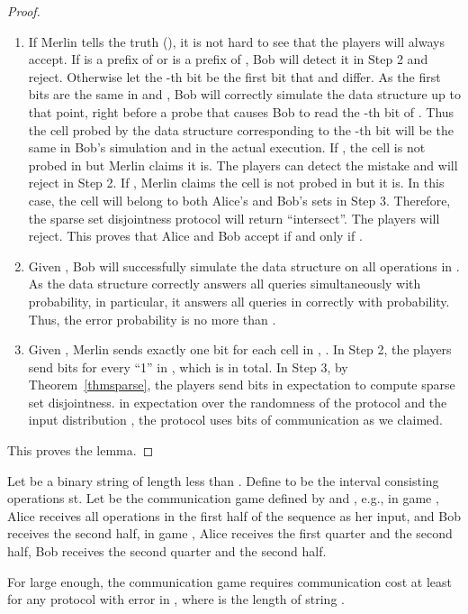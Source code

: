 \documentclass[11pt]{article}
\begin{document}
\begin{proof}
{\begin{enumerate}
\item
	If Merlin tells the truth (), it is not hard to see that the players will always accept. If  is a prefix of  or  is a prefix of , Bob will detect it in Step 2 and reject. Otherwise let the -th bit be the first bit that  and  differ. As the first  bits are the same in  and , Bob will correctly simulate the data structure up to that point, right before a probe that causes Bob to read the -th bit of . Thus the cell probed by the data structure corresponding to the -th bit will be the same in Bob's simulation and in the actual execution.  If , the cell is not probed in  but Merlin claims it is. The players can detect the mistake and will reject in Step 2. If , Merlin claims the cell is not probed in  but it is. In this case, the cell will belong to both Alice's and Bob's sets in Step 3. Therefore, the sparse set disjointness protocol will return ``intersect''. The players will reject. This proves that Alice and Bob accept if and only if . 
\item
	Given , Bob will successfully simulate the data structure on all operations in . As the data structure correctly answers all queries simultaneously with  probability, in particular, it answers all queries in  correctly with  probability. Thus, the error probability is no more than . 
\item
	Given , Merlin sends exactly one bit for each cell in , . In Step 2, the players send  bits for every ``1'' in , which is  in total. In Step 3, by Theorem~\ref{thmsparse}, the players send  bits in expectation to compute sparse set disjointness. in expectation over the randomness of the protocol and the input distribution , the protocol uses 
	 bits of communication as we claimed. 
\end{enumerate}

This proves the lemma.
}

\end{proof}

Let  be a binary string of length less than . Define  to be the interval consisting operations st. Let  be the communication game defined by  and , e.g., in game , Alice receives all operations in the first half of the sequence as her input, and Bob receives the second half, in game , Alice receives the first quarter and the second half, Bob receives the second quarter and the second half. 
\begin{lemma}\label{commlower}
For  large enough, the communication game  requires communication cost at least  for any protocol with error  in \mm{}, where  is the length of string . 
\end{lemma}
\end{document}
